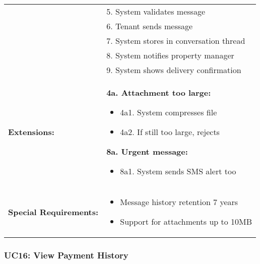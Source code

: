 \documentclass[12pt]{article}
\begin{document}
\begin{tabular}{|p{3cm}|p{11cm}|}
& 5. System validates message \\
& 6. Tenant sends message \\
& 7. System stores in conversation thread \\
& 8. System notifies property manager \\
& 9. System shows delivery confirmation \\
\hline
\textbf{Extensions:} & 
\textbf{4a. Attachment too large:}
\begin{itemize}
    \item 4a1. System compresses file
    \item 4a2. If still too large, rejects
\end{itemize}
\textbf{8a. Urgent message:}
\begin{itemize}
    \item 8a1. System sends SMS alert too
\end{itemize} \\
\hline
\textbf{Special Requirements:} & 
\begin{itemize}
    \item Message history retention 7 years
    \item Support for attachments up to 10MB
\end{itemize} \\
\hline
\end{tabular}

\subsubsection{UC16: View Payment History}
\end{document}
